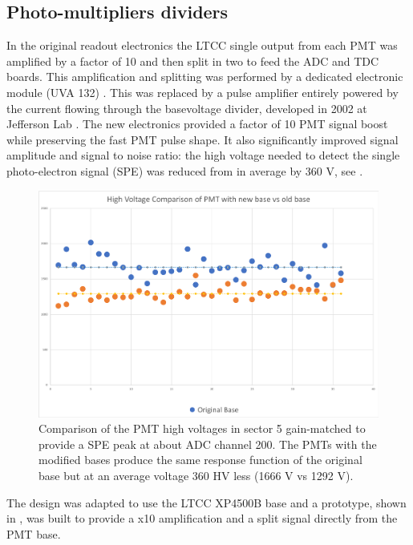 \subsection{Photo-multipliers dividers}

In the original readout electronics the LTCC single output from each PMT was amplified by a factor of 10
and then split in two to feed the ADC and TDC boards. This amplification and splitting was performed
by a dedicated electronic module (UVA 132) \cite{Adams:2001kk}. This was replaced by a pulse amplifier entirely powered by
the current flowing through the basevoltage divider, developed in 2002 at Jefferson Lab \cite{Popov:2003mj}.
The new electronics provided a factor of 10 PMT signal boost while preserving the fast PMT pulse shape. It also significantly improved signal amplitude and
signal to noise ratio: the high voltage needed to detect the single photo-electron signal (SPE) was reduced from in average by 360 V, see .

\begin{figure}
	\centering
	\includegraphics[width=0.95\columnwidth,keepaspectratio]{img/pmtHVImprovement.png}
	\caption{Comparison of the PMT high voltages in sector 5 gain-matched to provide a SPE peak at about ADC channel 200.
            The PMTs with the modified bases produce the same response function of the original base but at an average voltage 360 HV less (1666 V vs 1292 V).}
	\label{fig:pmtHVImprovement}
\end{figure}

The design was adapted to use the LTCC XP4500B base and a prototype, shown in , was built to provide a x10
amplification and a split signal directly from the PMT base.


